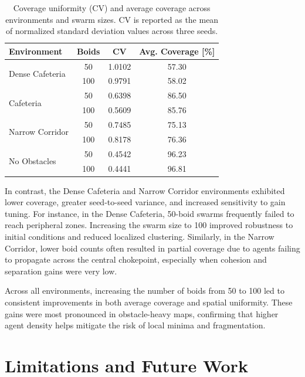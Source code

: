 \documentclass[12pt]{article}
\begin{document}
\begin{table}[h!]
    \centering
    \begin{tabular}{|l|c|c|c|}
    \hline
    \textbf{Environment} & \textbf{Boids} & \textbf{CV} & \textbf{Avg. Coverage [\%]} \\
    
    \hline
    \multirow{2}{*}{Dense Cafeteria}    & 50  & 1.0102 & 57.30 \\
                                        & 100 & 0.9791 & 58.02 \\
    \hline
    \multirow{2}{*}{Cafeteria}          & 50  & 0.6398 & 86.50 \\
                                        & 100 & 0.5609 & 85.76 \\
    \hline
    \multirow{2}{*}{Narrow Corridor}    & 50  & 0.7485 & 75.13 \\
                                        & 100 & 0.8178 & 76.36 \\
    \hline
    \multirow{2}{*}{No Obstacles}       & 50  & 0.4542 & 96.23 \\
                                        & 100 & 0.4441 & 96.81 \\
    \hline
    \end{tabular}
    \caption{Coverage uniformity (CV) and average coverage across environments and swarm sizes. CV is reported as the mean of normalized standard deviation values across three seeds.}
    \label{tab:cv_and_coverage}
    \end{table}    

In contrast, the Dense Cafeteria and Narrow Corridor environments exhibited lower coverage, greater seed-to-seed variance, and increased sensitivity to gain tuning. For instance, in the Dense Cafeteria, 50-boid swarms frequently failed to reach peripheral zones. Increasing the swarm size to 100 improved robustness to initial conditions and reduced localized clustering. Similarly, in the Narrow Corridor, lower boid counts often resulted in partial coverage due to agents failing to propagate across the central chokepoint, especially when cohesion and separation gains were very low.

Across all environments, increasing the number of boids from 50 to 100 led to consistent improvements in both average coverage and spatial uniformity. These gains were most pronounced in obstacle-heavy maps, confirming that higher agent density helps mitigate the risk of local minima and fragmentation.

\section{Limitations and Future Work}
\end{document}
